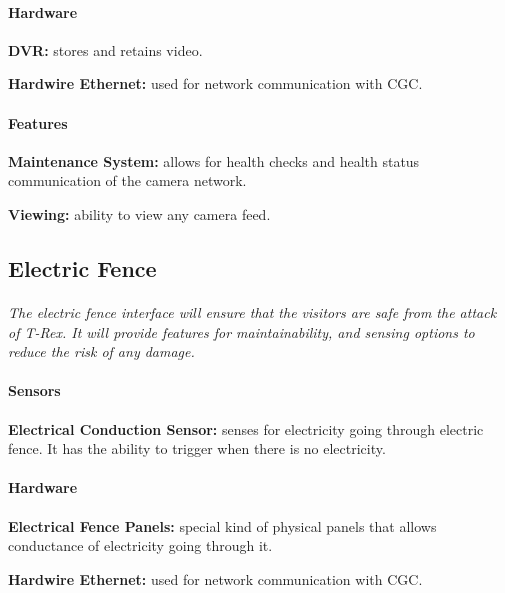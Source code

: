 \documentclass[12pt]{article}
\begin{document}
	\paragraph{Hardware}
	\begin{list}{}{}
		\item \textbf{DVR: }stores and retains video.
		\item \textbf{Hardwire Ethernet: }used for network communication with CGC. 
	\end{list}
	
	\paragraph{Features}
	\begin{list}{}{}
		\item \textbf{Maintenance System: }allows for health checks and health status communication of the camera network.
        \item \textbf{Viewing: }ability to view any camera feed.
	\end{list}

	\subsection{Electric Fence}
	\paragraph{} \textit{The electric fence interface will ensure that the visitors are safe from the attack of T-Rex. It will provide features for maintainability, and sensing options to reduce the risk of any damage.}		
	
	\paragraph{Sensors}
	\begin{list}{}{}
		\item \textbf{Electrical Conduction Sensor: }senses for electricity going through electric fence. It has the ability to trigger when there is no electricity. 
	\end{list}
		
	\paragraph{Hardware}
	\begin{list}{}{}
		\item \textbf{Electrical Fence Panels: }special kind of physical panels that allows conductance of electricity going through it.
		\item \textbf{Hardwire Ethernet: }used for network communication with CGC. 
	\end{list}
	
\end{document}
